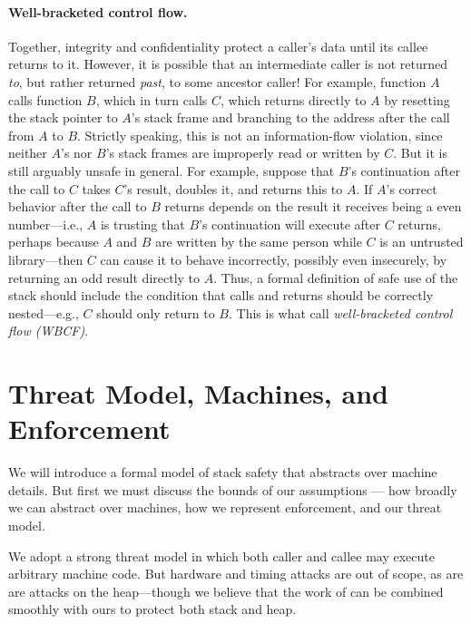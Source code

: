 \documentclass[acmsmall,review,anonymous]{acmart}\settopmatter{printfolios=true,printccs=false,printacmref=false}
\begin{document}
\paragraph{Well-bracketed control flow.} Together,
integrity and confidentiality protect a caller's data until its callee
returns to it. However, it is possible that an intermediate caller is not
returned {\em to}, but rather returned {\em past}, to some ancestor caller!
For example, function $A$ calls function $B$, which in turn calls $C$, which
returns directly to $A$ by resetting the stack pointer to $A$'s stack frame
and branching to the address after the call from $A$ to $B$.  Strictly
speaking, this is not an information-flow violation, since neither $A$'s nor
$B$'s stack frames are improperly read or written by $C$.  But it is still
arguably unsafe in general.  For example, suppose that $B$'s continuation
after the call to $C$ takes $C$'s result, doubles it, and returns this to
$A$.  If $A$'s correct behavior after the call to $B$ returns depends on the
result it receives being a even number---i.e., $A$ is trusting that $B$'s
continuation will execute after $C$ returns, perhaps because $A$ and $B$ are
written by the same person while $C$ is an untrusted library---then $C$ can
cause it to behave incorrectly, possibly even insecurely, by returning an
odd result directly to $A$.
%
Thus, a formal definition of safe use of the stack should include the
condition that calls and returns should be correctly nested---e.g., $C$ should
only return to $B$.  This is what \citet{SkorstengaardSTKJFP}
call \emph{well-bracketed control flow (WBCF)}.

\section{Threat Model, Machines, and Enforcement }
\label{sec:setup}
\label{sec:threat}

We will introduce a formal model of stack safety that abstracts over
machine details. But first we must discuss the bounds of our assumptions ---
how broadly we can abstract over machines, how we represent enforcement, and
our threat model.

We adopt a strong threat model in which both caller and callee may execute
arbitrary machine code. But hardware and timing attacks are out of scope, as are
are attacks on the heap---though we believe that the work of
\citet{DBLP:conf/post/AmorimHP18} can be combined smoothly with ours
to protect both stack and heap.
\end{document}
